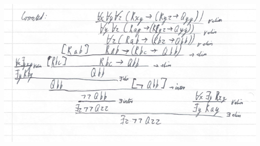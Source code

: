 \documentclass[a4paper, 11pt]{article} %
\newenvironment{Answer}[1][Answer]
  {\proof[#1]\leftskip=1cm\rightskip=1cm}
  {\endproof}
\theoremstyle{theorem}
\theoremstyle{Pthm}
\begin{document}
\begin{Answer}
  \begin{center}
    \includegraphics[width=1\textwidth]{6biii.png}
  \end{center}
\end{Answer}







\end{document}
